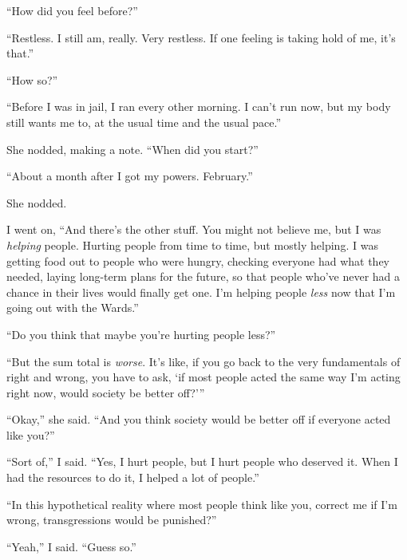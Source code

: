 ``How did you feel before?''



``Restless.  I still am, really.  Very restless.  If one feeling is taking hold of me, it's that.''



``How so?''



``Before I was in jail, I ran every other morning.  I can't run now, but my body still wants me to, at the usual time and the usual pace.''



She nodded, making a note.  ``When did you start?''



``About a month after I got my powers.  February.''



She nodded.



I went on, ``And there's the other stuff.  You might not believe me, but I was \emph{helping} people.  Hurting people from time to time, but mostly helping.  I was getting food out to people who were hungry, checking everyone had what they needed, laying long-term plans for the future, so that people who've never had a chance in their lives would finally get one.  I'm helping people \emph{less} now that I'm going out with the Wards.''



``Do you think that maybe you're hurting people less?''



``But the sum total is \emph{worse}.  It's like, if you go back to the very fundamentals of right and wrong, you have to ask, `if most people acted the same way I'm acting right now, would society be better off?'''



``Okay,'' she said.  ``And you think society would be better off if everyone acted like you?''



``Sort of,'' I said.  ``Yes, I hurt people, but I hurt people who deserved it.  When I had the resources to do it, I helped a lot of people.''



``In this hypothetical reality where most people think like you, correct me if I'm wrong, transgressions would be punished?''



``Yeah,'' I said.  ``Guess so.''



